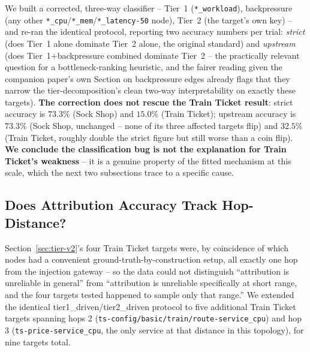 \documentclass[journal, 10pt]{IEEEtran}
\begin{document}
We built a corrected, three-way classifier -- Tier~1 (\texttt{*\_workload}), backpressure (any other \texttt{*\_cpu}/\texttt{*\_mem}/\texttt{*\_latency-50} node), Tier~2 (the target's own key) -- and re-ran the identical protocol, reporting two accuracy numbers per trial: \emph{strict} (does Tier~1 alone dominate Tier~2 alone, the original standard) and \emph{upstream} (does Tier~1$+$backpressure combined dominate Tier~2 -- the practically relevant question for a bottleneck-ranking heuristic, and the fairer reading given the companion paper's own Section on backpressure edges already flags that they narrow the tier-decomposition's clean two-way interpretability on exactly these targets). \textbf{The correction does not rescue the Train Ticket result}: strict accuracy is $73.3\%$ (Sock Shop) and $15.0\%$ (Train Ticket); upstream accuracy is $73.3\%$ (Sock Shop, unchanged -- none of its three affected targets flip) and $32.5\%$ (Train Ticket, roughly double the strict figure but still worse than a coin flip). \textbf{We conclude the classification bug is not the explanation for Train Ticket's weakness} -- it is a genuine property of the fitted mechanism at this scale, which the next two subsections trace to a specific cause.

\subsection{Does Attribution Accuracy Track Hop-Distance?}
\label{sec:hop-distance}
Section~\ref{sec:tier-v2}'s four Train Ticket targets were, by coincidence of which nodes had a convenient ground-truth-by-construction setup, all exactly one hop from the injection gateway -- so the data could not distinguish ``attribution is unreliable in general'' from ``attribution is unreliable specifically at short range, and the four targets tested happened to sample only that range.'' We extended the identical tier1\_driven/tier2\_driven protocol to five additional Train Ticket targets spanning hops 2 (\texttt{ts-config/basic/train/route-service\_cpu}) and hop 3 (\texttt{ts-price-service\_cpu}, the only service at that distance in this topology), for nine targets total.
\end{document}
